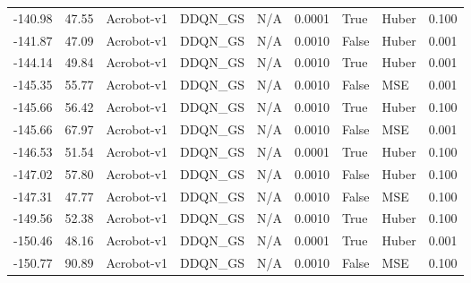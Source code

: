 \begin{tabular}{rrlllrllr}
-140.98 &   47.55 &      Acrobot-v1 &  DDQN\_GS &    N/A &  0.0001 &       True &         Huber &         0.100 \\
-141.87 &   47.09 &      Acrobot-v1 &  DDQN\_GS &    N/A &  0.0010 &      False &         Huber &         0.001 \\
-144.14 &   49.84 &      Acrobot-v1 &  DDQN\_GS &    N/A &  0.0010 &       True &         Huber &         0.001 \\
-145.35 &   55.77 &      Acrobot-v1 &  DDQN\_GS &    N/A &  0.0010 &      False &           MSE &         0.001 \\
-145.66 &   56.42 &      Acrobot-v1 &  DDQN\_GS &    N/A &  0.0010 &       True &         Huber &         0.100 \\
-145.66 &   67.97 &      Acrobot-v1 &  DDQN\_GS &    N/A &  0.0010 &      False &           MSE &         0.001 \\
-146.53 &   51.54 &      Acrobot-v1 &  DDQN\_GS &    N/A &  0.0001 &       True &         Huber &         0.100 \\
-147.02 &   57.80 &      Acrobot-v1 &  DDQN\_GS &    N/A &  0.0010 &      False &         Huber &         0.100 \\
-147.31 &   47.77 &      Acrobot-v1 &  DDQN\_GS &    N/A &  0.0010 &      False &           MSE &         0.100 \\
-149.56 &   52.38 &      Acrobot-v1 &  DDQN\_GS &    N/A &  0.0010 &       True &         Huber &         0.100 \\
-150.46 &   48.16 &      Acrobot-v1 &  DDQN\_GS &    N/A &  0.0001 &       True &         Huber &         0.001 \\
-150.77 &   90.89 &      Acrobot-v1 &  DDQN\_GS &    N/A &  0.0010 &      False &           MSE &         0.100 \\
\bottomrule
\end{tabular}
